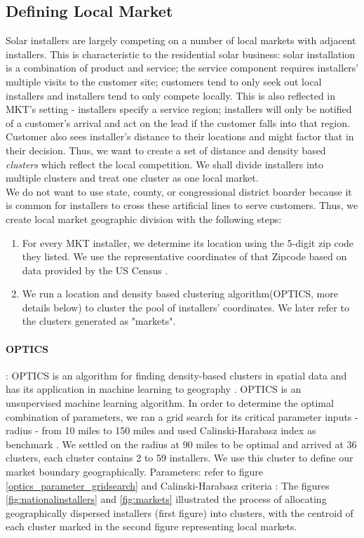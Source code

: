 \documentclass[msom,blindrev]{informs3}
\begin{document}
\subsection{Defining Local Market}
\label{defining_local_market}
Solar installers are largely competing on a number of local markets with adjacent installers.  This is characteristic to the residential solar business: solar installation is a combination of product and service; the service component requires installers' multiple visits to the customer site;  customers tend to only seek out local installers and installers tend to only compete locally. This is also reflected in MKT's setting - installers specify a service region; installers will only be notified of a customer's arrival and act on the lead if the customer falls into that region. Customer also sees installer's distance to their locations and might factor that in their decision. Thus, we want to create a set of distance and density based \textit{clusters} which reflect the local competition. We shall divide installers into multiple clusters and treat one cluster as one local market. \\
We do not want to use state, county, or congressional district boarder because it is common for installers to cross these artificial lines to serve customers. Thus, we create local market geographic division with the following steps:
\begin{enumerate}
	\item For every MKT installer, we determine its location using the 5-digit zip code they listed. We use the representative coordinates of that Zipcode based on data provided by the US Census \citep{us_census_bureau_2019}. 
	\item  We run a location and density based clustering algorithm(OPTICS, more details below) to cluster the pool of installers' coordinates. We later refer to the clusters generated as "markets".   
\end{enumerate}
\paragraph{OPTICS}: 
 OPTICS is an algorithm for finding density-based clusters in spatial data \citep{ankerst1999optics} and has its application in machine learning to geography \citep{teimouri2016method}. OPTICS is an unsupervised machine learning algorithm. In order to determine the optimal combination of parameters, we ran a grid search for its critical parameter inputs - radius - from 10 miles to 150 miles and used Calinski-Harabasz index as benchmark  \citep{calinski1974dendrite}. We settled on the radius at 90 miles to be optimal and arrived at 36 clusters, each cluster contains 2 to 59 installers. We use this cluster to define our market boundary geographically. Parameters: refer to figure \ref{optics_parameter_gridsearch} and Calinski-Harabasz criteria :
The figures \ref{fig:nationalinstallers} and \ref{fig:markets} illustrated the process of allocating geographically dispersed installers (first figure) into clusters, with the centroid of each cluster marked in the second figure representing local markets.
\end{document}
